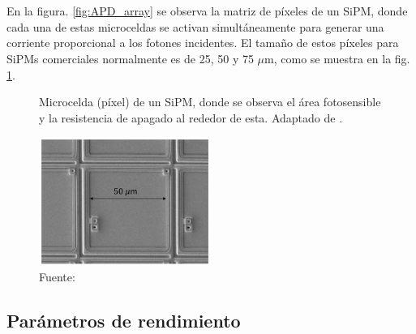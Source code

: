 \\ \\
En la figura. \ref{fig:APD_array} se observa la matriz de píxeles de un SiPM, donde cada una de estas microceldas se activan simultáneamente para generar una corriente proporcional a los fotones incidentes. El tamaño de estos píxeles para SiPMs comerciales normalmente es de 25, 50 y 75 $\mu$m, como se muestra en la fig. \ref{fig:APD_pitch}.     
\begin{figure}[h!]
\begin{centering}
    \caption{Microcelda (píxel) de un SiPM, donde se observa el área fotosensible y la resistencia de apagado al rededor de esta. Adaptado de \citep{MPPC_note}.}
    \includegraphics[width=0.5\textwidth]{Images/SiPM_pixel.PNG}
    \caption*{Fuente:}
    \label{fig:APD_pitch}  
  \par\end{centering}
\end{figure}

\subsection{Parámetros de rendimiento}
